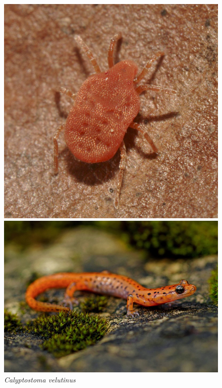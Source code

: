 \documentclass[draft, final]{report}
\begin{document}
\begin{figure}[!ht]
    \begin{minipage}[c]{.46\linewidth}
        \centering
        \includegraphics[scale=0.25]{LateX/Images/calyptostoma.png}
        \caption{\emph{Calyptostoma velutinus}\cite{calyptostoma}}
    \end{minipage}
    \hfill%
    \begin{minipage}[c]{.46\linewidth}
        \centering
        \includegraphics[scale=0.25]{LateX/Images/salamander.jpg}

\end{minipage}
\end{figure}
\end{document}
